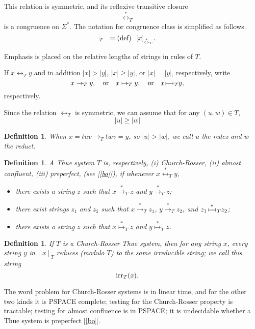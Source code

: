 \documentclass[12pt,a4paper]{article}
\newtheorem{definition}[theorem]{Definition}
\newcommand{\redstar}{{\overset{*}{\rightarrow}}}
\newcommand{\mapstar}{{\overset{*}{\mapsto}}}
\newcommand{\thuecong}{{\overset{*}{\leftrightarrow}}}
\newcommand{\irr}{{\text{\rm irr}}}
\newcommand{\pres}{\,
{\vrule height5pt width.5pt depth0pt
\overset{\vrule height.5pt width10pt depth0pt}
{\vrule height0pt width0pt depth0pt}
\vrule height5pt width.5pt depth0pt}\,}
\newcommand{\presstar}{{\overset{*}{\pres}}}
\numberwithin{equation}{section}
\newcommand{\be}{\begin{equation*}}
\newcommand{\ee}{\end{equation*}}
\begin{document}
This relation is symmetric, and its
reflexive transitive closure
\be
{\thuecong}_T
\ee
is a congruence on $\Sigma^*$.
The notation for  congruence class is simplified as follows.
\be
[x]_T ~~=\text{\rm (def)}~~ [x]_{{\thuecong}_T}.
\ee

Emphasis is placed on the relative lengths of strings
in rules of $T$.

\noindent
If $x\leftrightarrow_T y$ and in addition $|x|>|y|$, $|x| \geq |y|$, or
$|x|=|y|$, respectively, write
\be
x \to_T y,\quad\text{or}\quad x \mapsto_T y,
\quad\text{or}\quad x {\pres}_T y,
\ee
respectively.

Since the relation $\leftrightarrow_T$ is
symmetric, we can assume that for any
$(u,w)\in T$,
\be
|u| \geq |w|
\ee

\begin{definition}
\label{def: redex}
When $x = tuv \to_T twv = y$, so
$|u| > |w|$, we call $u$ the {\em redex} and $w$ the {\em reduct}.
\end{definition}


\begin{definition}
A Thue system $T$ is, respectively, {\rm (i)} Church-Rosser,
{\rm (ii)} almost confluent, {\rm (iii)} preperfect,
(see {\rm [\ref{bo}]}), if whenever $x {\thuecong}_T y$,

\begin{itemize}
\item [{\rm (i)}] 
there exists a string $z$ such that $x {\redstar}_T z$ and
$y {\redstar}_T z$;
\item [{\rm (ii)}] there exist strings $z_1$ and $z_2$ such that
$x {\redstar}_T z_1$,
$y {\redstar}_T z_2$,
and $z_1 {\presstar}_T z_2$;
\item [{\rm (iii)}]
there exists a string $z$ such that
$x {\mapstar}_T z$ and $y {\mapstar}_T z$.
\end{itemize}
\end{definition}

\begin{definition}
\label{def: irr}
If $T$ is a Church-Rosser Thue system, then for any string
$x$, every string $y$ in $[x]_T$ reduces (modulo $T$) to
the same irreducible string; we call this string
\be
\irr_T(x) .
\ee
\end{definition}

The word problem for Church-Rosser systems is in linear
time, and for the other two kinds it is PSPACE complete;
testing for the Church-Rosser property is tractable;
testing for almost confluence is in PSPACE;
it is undecidable whether a Thue system is preperfect [\ref{bo}].
\end{document}
